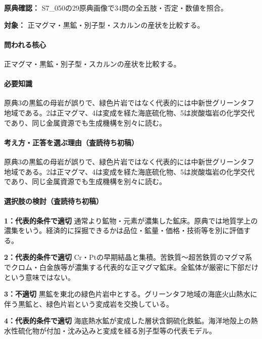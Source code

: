 \noindent\textbf{原典確認：} S7\_050の29原典画像で34問の全五肢・否定・数値を照合。\par

\noindent\textbf{対象：} 正マグマ・黒鉱・別子型・スカルンの産状を比較する。\par

\paragraph{問われる核心} 正マグマ・黒鉱・別子型・スカルンの産状を比較する。

\paragraph{必要知識} 原典3の黒鉱の母岩が誤りで、緑色片岩ではなく代表的には中新世グリーンタフ地域である。2は正マグマ、4は変成を経た海底硫化物、5は炭酸塩岩の化学交代であり、同じ金属資源でも生成機構を別々に読む。

\paragraph{考え方・正答を選ぶ理由（査読待ち初稿）} 原典3の黒鉱の母岩が誤りで、緑色片岩ではなく代表的には中新世グリーンタフ地域である。2は正マグマ、4は変成を経た海底硫化物、5は炭酸塩岩の化学交代であり、同じ金属資源でも生成機構を別々に読む。

\paragraph{選択肢の検討（査読待ち初稿）}\mbox{}\par

\noindent\textbf{1：代表的条件で適切} 通常より鉱物・元素が濃集した鉱床。原典では地質学上の濃集をいう。経済的に採掘できるかは品位・鉱量・価格・技術等を別に評価する。\par

\noindent\textbf{2：代表的条件で適切} Cr・Ptの早期結晶と集積。苦鉄質～超苦鉄質のマグマ系でクロム・白金族等が濃集する代表的な正マグマ鉱床。全鉱体が厳密に下部だけという意味ではない。\par

\noindent\textbf{3：不適切} 黒鉱を東北の緑色片岩中とする。グリーンタフ地域の海底火山熱水に伴う黒鉱と、緑色片岩という変成岩を交換している。\par

\noindent\textbf{4：代表的条件で適切} 海底熱水鉱が変成した層状含銅硫化鉄鉱。海洋地殻上の熱水性硫化物が付加・沈み込みと変成を経る別子型等の代表モデル。\par

